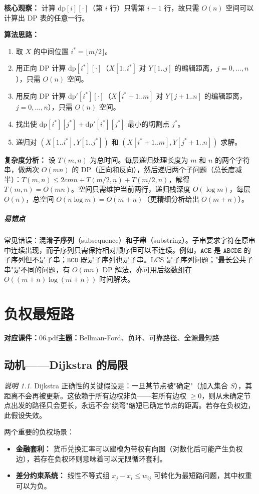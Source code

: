 \documentclass[UTF8,openany,12pt]{ctexbook}
\theoremstyle{remark}
\newtheorem{remark}{说明}[chapter]
\newcommand{\lecture}[3]{
  \chapter{#2}
  \noindent\textbf{对应课件：}#1\hfill\textbf{主题：}#3
  \vspace{0.6em}
}
\newcommand{\pitfall}[1]{\paragraph{易错点}#1}
\begin{document}
\textbf{核心观察：} 计算 $\mathrm{dp}[i][\cdot]$（第 $i$ 行）只需第 $i-1$ 行，故只需 $O(n)$ 空间可以计算出 DP 表的任意一行。

\textbf{算法思路：}
\begin{enumerate}
  \item 取 $X$ 的中间位置 $i^* = \lfloor m/2 \rfloor$。
  \item 用正向 DP 计算 $\mathrm{dp}[i^*][\cdot]$（$X[1..i^*]$ 对 $Y[1..j]$ 的编辑距离，$j=0,\ldots,n$），只需 $O(n)$ 空间。
  \item 用反向 DP 计算 $\mathrm{dp}'[i^*][\cdot]$（$X[i^*+1..m]$ 对 $Y[j+1..n]$ 的编辑距离，$j=0,\ldots,n$），只需 $O(n)$ 空间。
  \item 找出使 $\mathrm{dp}[i^*][j^*] + \mathrm{dp}'[i^*][j^*]$ 最小的切割点 $j^*$。
  \item 递归对 $(X[1..i^*], Y[1..j^*])$ 和 $(X[i^*+1..m], Y[j^*+1..n])$ 求解。
\end{enumerate}

\textbf{复杂度分析：} 设 $T(m,n)$ 为总时间。每层递归处理长度为 $m$ 和 $n$ 的两个字符串，做两次 $O(mn)$ 的 DP（正向和反向），然后递归两个子问题（总长度减半）：$T(m,n) \leq 2cmn + T(m/2, n) + T(m/2, n) $，解得 $T(m,n) = O(mn)$。空间只需维护当前两行，递归栈深度 $O(\log m)$，每层 $O(n)$，总空间 $O(n \log m) = O(m+n)$（更精细分析给出 $O(m+n)$）。

\pitfall{常见错误：混淆\textbf{子序列}（subsequence）和\textbf{子串}（substring）。子串要求字符在原串中连续出现，而子序列只需保持相对顺序但可以不连续。例如，$\texttt{ACE}$ 是 $\texttt{ABCDE}$ 的子序列但不是子串；$\texttt{BCD}$ 既是子序列也是子串。LCS 是子序列问题；"最长公共子串"是不同的问题，有 $O(mn)$ DP 解法，亦可用后缀数组在 $O((m+n)\log(m+n))$ 时间解决。}

\lecture{06.pdf}{负权最短路}{Bellman-Ford、负环、可靠路径、全源最短路}

\section{动机——Dijkstra 的局限}

\begin{remark}
Dijkstra 正确性的关键假设是：一旦某节点被"确定"（加入集合 $S$），其距离不会再被更新。这依赖于所有边权非负——若所有边权 $\geq 0$，则从未确定节点出发的路径只会更长，永远不会"绕弯"缩短已确定节点的距离。若存在负权边，此假设失效。
\end{remark}

两个重要的负权场景：
\begin{itemize}
  \item \textbf{金融套利：} 货币兑换汇率可以建模为带权有向图（对数化后可能产生负权边），若存在负权环则意味着可以无限循环套利。
  \item \textbf{差分约束系统：} 线性不等式组 $x_j - x_i \leq w_{ij}$ 可转化为最短路问题，其中权重可以为负。
\end{itemize}
\end{document}
